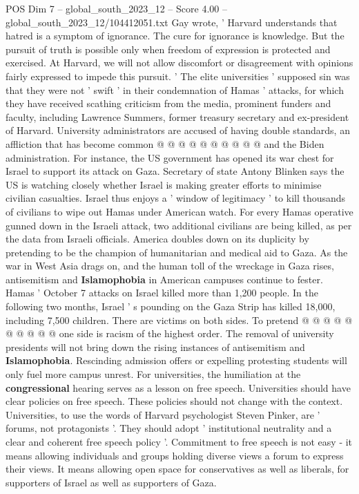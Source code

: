 \begin{textsample}{POS Dim 7 – global\_south\_2023\_12 – Score 4.00 – global\_south\_2023\_12/104412051.txt}
Gay wrote, ' Harvard understands that hatred is a symptom of ignorance.
The cure for ignorance is knowledge.
But the pursuit of truth is possible only when freedom of expression is protected and exercised.
At Harvard, we will not allow discomfort or disagreement with opinions fairly expressed to impede this pursuit. ' The elite universities ' supposed sin was that they were not ' swift ' in their condemnation of Hamas ' attacks, for which they have received scathing criticism from the media, prominent funders and faculty, including Lawrence Summers, former treasury secretary and ex-president of Harvard.
University administrators are accused of having double standards, an affliction that has become common @ @ @ @ @ @ @ @ @ @ and the Biden administration.
For instance, the US government has opened its war chest for Israel to support its attack on Gaza.
Secretary of state Antony Blinken says the US is watching closely whether Israel is making greater efforts to minimise civilian casualties.
Israel thus enjoys a ' window of legitimacy ' to kill thousands of civilians to wipe out Hamas under American watch.
For every Hamas operative gunned down in the Israeli attack, two additional civilians are being killed, as per the data from Israeli officials.
America doubles down on its duplicity by pretending to be the champion of humanitarian and medical aid to Gaza.
As the war in West Asia drags on, and the human toll of the wreckage in Gaza rises, antisemitism and \textbf{Islamophobia} in American campuses continue to fester.
Hamas ' October 7 attacks on Israel killed more than 1,200 people.
In the following two months, Israel ' s pounding on the Gaza Strip has killed 18,000, including 7,500 children.
There are victims on both sides.
To pretend @ @ @ @ @ @ @ @ @ @ one side is racism of the highest order.
The removal of university presidents will not bring down the rising instances of antisemitism and \textbf{Islamophobia}.
Rescinding admission offers or expelling protesting students will only fuel more campus unrest.
For universities, the humiliation at the \textbf{congressional} hearing serves as a lesson on free speech.
Universities should have clear policies on free speech.
These policies should not change with the context.
Universities, to use the words of Harvard psychologist Steven Pinker, are ' forums, not protagonists '.
They should adopt ' institutional neutrality and a clear and coherent free speech policy '.
Commitment to free speech is not easy - it means allowing individuals and groups holding diverse views a forum to express their views.
It means allowing open space for conservatives as well as liberals, for supporters of Israel as well as supporters of Gaza.

\end{textsample}

